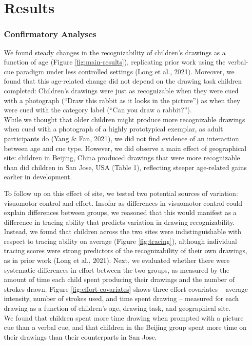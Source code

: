 \documentclass[
  man]{apa6}
\begin{document}
\hypertarget{results}{%
\section{Results}\label{results}}

\hypertarget{confirmatory-analyses}{%
\subsubsection{Confirmatory Analyses}\label{confirmatory-analyses}}

We found steady changes in the recognizability of children's drawings as a function of age (Figure \ref{fig:main-results}), replicating prior work using the verbal-cue paradigm under less controlled settings (Long et al., 2021).
Moreover, we found that this age-related change did not depend on the drawing task children completed: Children's drawings were just as recognizable when they were cued with a photograph (``Draw this rabbit as it looks in the picture'') as when they were cued with the category label (``Can you draw a rabbit?'').\\
While we thought that older children might produce more recognizable drawings when cued with a photograph of a highly prototypical exemplar, as adult participants do (Yang \& Fan, 2021), we did not find evidence of an interaction between age and cue type.
However, we did observe a main effect of geographical site: children in Beijing, China produced drawings that were more recognizable than did children in San Jose, USA (Table 1), reflecting steeper age-related gains earlier in development.

To follow up on this effect of site, we tested two potential sources of variation: visuomotor control and effort.
Insofar as differences in visuomotor control could explain differences between groups, we reasoned that this would manifest as a difference in tracing ability that predicts variation in drawing recognizability.
Instead, we found that children across the two sites were indistinguishable with respect to tracing ability on average (Figure \ref{fig:tracing}), although individual tracing scores were strong predictors of the recognizability of their own drawings, as in prior work (Long et al., 2021).
Next, we evaluated whether there were systematic differences in effort between the two groups, as measured by the amount of time each child spent producing their drawings and the number of strokes drawn.
Figure \ref{fig:effort-covariates} shows three effort covariates -- average intensity, number of strokes used, and time spent drawing -- measured for each drawing as a function of children's age, drawing task, and geographical site.\\
We found that children spent more time drawing when prompted with a picture cue than a verbal cue, and that children in the Beijing group spent more time on their drawings than their counterparts in San Jose.
\end{document}
